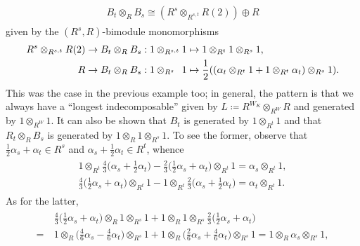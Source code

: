 \begin{example}
\begin{align*}
\begin{split}
B_t \otimes_R B_s \cong (R^s \otimes_{R^{s,t}} R(2)) \oplus R
\end{split}
\end{align*}
\noindent given by the $(R^s, R)$-bimodule monomorphisms
\begin{align*}
\begin{split}
R^s \otimes_{R^{s,t}} R(2) &\to B_t \otimes_R B_s : 1 \otimes_{R^{s,t}} 1 \mapsto 1 \otimes_{R^t} 1 \otimes_{R^s} 1,\\
R &\to B_t \otimes_R B_s : 1 \otimes_{R^{s\hphantom{,t}}} 1 \mapsto \frac{1}{2}((\alpha_t \otimes_{R^t} 1 + 1 \otimes_{R^t} \alpha_t) \otimes_{R^s} 1).
\end{split}
\end{align*}
\newpage
\noindent This was the case in the previous example too; in general, the pattern is that we always have a ``longest indecomposable'' given by $L \coloneqq R^{W_K} \otimes_{R^W} R$ and generated by $1 \otimes_{R^W} 1$. It can also be shown that $B_t$ is generated by $1 \otimes_{R^t} 1$ and that $R_t \otimes_R B_s$ is generated by $1 \otimes_R 1 \otimes_{R^s} 1$. To see the former, observe that $\frac{1}{2}\alpha_s + \alpha_t \in R^s$ and $\alpha_s + \frac{1}{2}\alpha_t \in R^t$, whence
\begin{align*}
\begin{split}
1 \otimes_{R^t} \frac{4}{3}\Big(\alpha_s + \frac{1}{2}\alpha_t\Big) - \frac{2}{3}\Big(\frac{1}{2}\alpha_s + \alpha_t\Big) \otimes_{R^t} 1 = \alpha_s \otimes_{R^t} 1,\\
\frac{4}{3}\Big(\frac{1}{2}\alpha_s + \alpha_t\Big) \otimes_{R^t} 1 - 1 \otimes_{R^t} \frac{2}{3}\Big(\alpha_s + \frac{1}{2}\alpha_t\Big) = \alpha_t \otimes_{R^t} 1.
\end{split}
\end{align*}
\noindent As for the latter,
\begin{align*}
\begin{split}
&\ \frac{4}{3}\Big(\frac{1}{2}\alpha_s + \alpha_t\Big) \otimes_R 1 \otimes_{R^s} 1 + 1 \otimes_R 1 \otimes_{R^s} \frac{2}{3}\Big(\frac{1}{2}\alpha_s + \alpha_t\Big)\\
=&\ 1 \otimes_R \Big(\frac{4}{6}\alpha_s - \frac{4}{6}\alpha_t\Big) \otimes_{R^s} 1 + 1 \otimes_R \Big(\frac{2}{6}\alpha_s + \frac{4}{6}\alpha_t\Big) \otimes_{R^s} 1 = 1 \otimes_R \alpha_s \otimes_{R^s} 1,
\end{split}
\end{align*}

\end{example}
